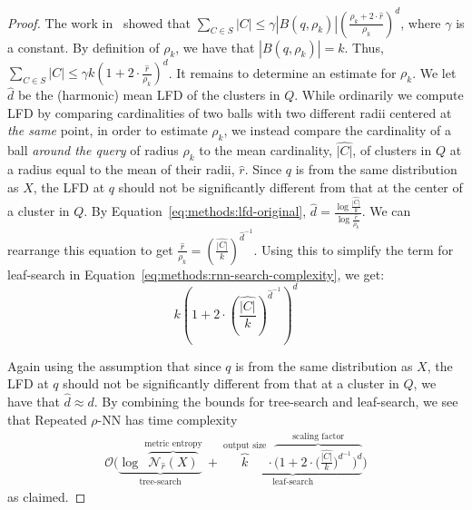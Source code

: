 \begin{proof}
The work in~\cite{yu2015entropy} showed that $\sum_{C \in S} |C| \leq \gamma  \left| B(q, \rho_k) \right| \left(\frac{\rho_k + 2 \cdot \hat{r}}{\rho_k} \right)^d$, where $\gamma$ is a constant.
By definition of $\rho_k$, we have that $|B(q, \rho_k)| = k$.
Thus, $\sum_{C \in S} |C| \leq \gamma k \left( 1 + 2 \cdot \frac{\hat{r}}{\rho_k} \right)^d$.
It remains to determine an estimate for $\rho_k$.
We let $\hat{d}$ be the (harmonic) mean LFD of the clusters in $Q$.
While ordinarily we compute LFD by comparing cardinalities of two balls with two different radii centered at \textit{the same} point, in order to estimate $\rho_k$, we instead compare the cardinality of a ball \textit{around the query} of radius $\rho_k$ to the mean cardinality, $\hat{|C|}$, of clusters in $Q$ at a radius equal to the mean of their radii, $\hat{r}$.
Since $q$ is from the same distribution as $X$, the LFD at $q$ should not be significantly different from that at the center of a cluster in $Q$.
By Equation~\ref{eq:methods:lfd-original}, $\hat{d} = \frac{\log{}\frac{\hat{|C|}}{k}}{\log{}\frac{\hat{r}}{\rho_k}}$.
We can rearrange this equation to get $\frac{\hat{r}}{\rho_k} = \left( \frac{\hat{|C|}}{k} \right)^{\hat{d}^{-1}}$.
Using this to simplify the term for leaf-search in Equation~\ref{eq:methods:rnn-search-complexity}, we get:
\begin{equation*}
    k \left( 1 + 2 \cdot \left( \frac{\hat{|C|}}{k} \right) ^ {\hat{d}^{-1}} \right)^d
\end{equation*}

Again using the assumption that since $q$ is from the same distribution as $X$, the LFD at $q$ should not be significantly different from that at a cluster in $Q$, we have that $\hat{d} \approx d$.
By combining the bounds for tree-search and leaf-search, we see that Repeated $\rho$-NN has time complexity
\begin{gather*}
    \mathcal{O}
    \Bigg(
        \underbrace{
            \log~\overbrace{\mathcal{N}_{\hat{r}}(X)}^{\textrm{metric entropy}}
        }_{\textrm{tree-search}}
        \ + \
        \underbrace{
            \overbrace{k}^{\textrm{output size}} \cdot
            \overbrace{\bigg( 1 + 2 \cdot \Big( \frac{\hat{|C|}}{k} \Big) ^ {d^{-1}} \bigg)^d}^{\textrm{scaling factor}}
        }_{\textrm{leaf-search}}
    \Bigg)
    \label{eq:methods:repeated-rnn-complexity}
\end{gather*}
as claimed.
\end{proof}

